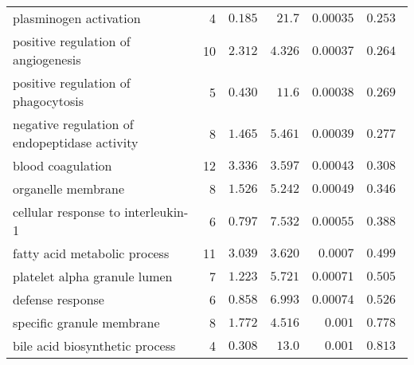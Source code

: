 \begin{longtable*}{|l|r|r|r|r|r|}
    plasminogen activation                                & 4                       & $ 0.185$                & $  21.7$     & $0.00035$            & $ 0.253~~$                      \\
    positive regulation of angiogenesis                   & 10                      & $ 2.312$                & $ 4.326$   & $0.00037$            & $ 0.264~~$                      \\
    positive regulation of phagocytosis                   & 5                       & $ 0.430$                & $  11.6$     & $0.00038$            & $ 0.269~~$                      \\
    negative regulation of endopeptidase activity         & 8                       & $ 1.465$                & $ 5.461$   & $0.00039$            & $ 0.277~~$                      \\
    blood coagulation                                     & 12                      & $ 3.336$                & $ 3.597$   & $0.00043$            & $ 0.308~~$                      \\
    organelle membrane                                    & 8                       & $ 1.526$                & $ 5.242$   & $0.00049$            & $ 0.346~~$                      \\
    cellular response to interleukin-1                    & 6                       & $ 0.797$                & $ 7.532$   & $0.00055$            & $ 0.388~~$                      \\
    fatty acid metabolic process                          & 11                      & $ 3.039$                & $ 3.620$   & $0.0007$             & $ 0.499~~$                      \\
    platelet alpha granule lumen                          & 7                       & $ 1.223$                & $ 5.721$   & $0.00071$            & $ 0.505~~$                      \\
    defense response                                      & 6                       & $ 0.858$                & $ 6.993$   & $0.00074$            & $ 0.526~~$                      \\
    specific granule membrane                             & 8                       & $ 1.772$                & $ 4.516$   & $ 0.001$             & $ 0.778~~$                      \\
    bile acid biosynthetic process                        & 4                       & $ 0.308$                & $  13.0$     & $ 0.001$             & $ 0.813~~$                      \\

\end{longtable*}

